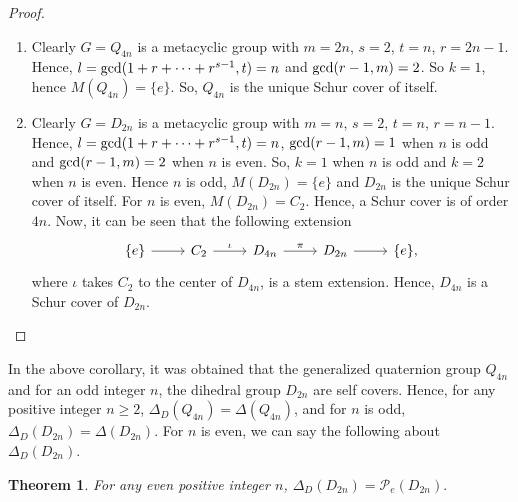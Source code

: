 \documentclass[12pt,a4paper]{article}
\newtheorem{theorem}{Theorem}[section]
\begin{document}
\begin{proof}
\noindent
    \begin{enumerate}[\rm (i)]
        \item Clearly $G=Q_{4n}$ is a metacyclic group with $m=2n$, $s=2$, $t=n$, $r=2n-1$. Hence, $l={\rm gcd}(1+r+\dots+r^{s-1},t)=n$ and ${\rm gcd}(r-1,m)=2$. So $k=1$, hence $M(Q_{4n})=\{e\}$. So, $Q_{4n}$ is the unique Schur cover of itself.
        \item Clearly $G=D_{2n}$ is a metacyclic group with $m=n$, $s=2$, $t=n$, $r=n-1$. Hence, $l={\rm gcd}(1+r+\dots+r^{s-1},t)=n$, ${\rm gcd}(r-1,m)=1$ when $n$ is odd and ${\rm gcd}(r-1,m)=2$ when $n$ is even. So, $k=1$ when $n$ is odd and $k=2$ when $n$ is even. Hence $n$ is odd, $M(D_{2n})=\{e\}$ and $D_{2n}$ is the unique Schur cover of itself. For $n$ is even, $M(D_{2n})=C_2$. Hence, a Schur cover is of order $4n$. Now, it can be seen that the following extension
        \[\begin{tikzcd}
        \{e\} \arrow[r] & C_2 \arrow[r, "\iota"] & D_{4n} \arrow[r, "\pi"] & D_{2n} \arrow[r] & \{e\}, 
        \end{tikzcd}\]
        where $\iota$ takes $C_2$ to the center of $D_{4n}$, is a stem extension. Hence, $D_{4n}$ is a Schur cover of $D_{2n}$.
    \end{enumerate}
\end{proof} 

In the above corollary, it was obtained that the generalized quaternion group $Q_{4n}$ and for an odd integer $n$, the dihedral group $D_{2n}$ are self covers. Hence, for any positive integer $n\geq 2$, $\Delta_D(Q_{4n})=\Delta(Q_{4n})$, and for $n$ is odd, $\Delta_D(D_{2n})=\Delta(D_{2n})$. For $n$ is even, we can say the following about $\Delta_D(D_{2n})$. 
\begin{theorem}\label{dihedral equality}
For any even positive integer $n$, $\Delta_D(D_{2n})=\mathcal{P}_e(D_{2n}).$   
\end{theorem}
\end{document}
